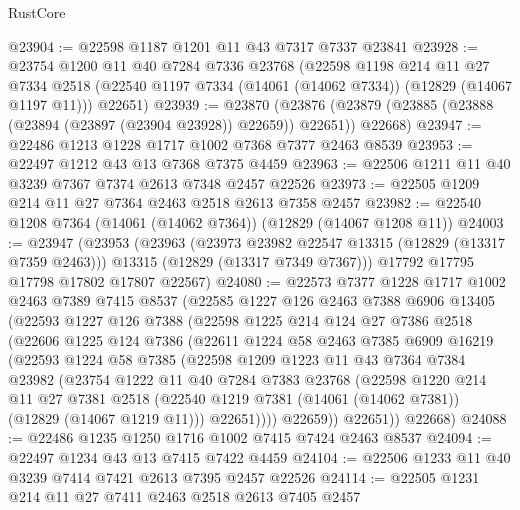 \begin{lexlean}{RustCore}
\begin{coremodule}
@23904 := @22598 @1187 @1201 @11 @43 @7317 @7337 @23841
@23928 := @23754
    @1200
    @11
    @40
    @7284
    @7336
    @23768
    (@22598
      @1198
      @214
      @11
      @27
      @7334
      @2518
      (@22540 @1197 @7334 (@14061 (@14062 @7334)) (@12829 (@14067 @1197 @11)))
      @22651)
@23939 := @23870
    (@23876 (@23879 (@23885 (@23888 (@23894 (@23897 (@23904 @23928)) @22659)) @22651)) @22668)
@23947 := @22486 @1213 @1228 @1717 @1002 @7368 @7377 @2463 @8539
@23953 := @22497 @1212 @43 @13 @7368 @7375 @4459
@23963 := @22506 @1211 @11 @40 @3239 @7367 @7374 @2613 @7348 @2457 @22526
@23973 := @22505 @1209 @214 @11 @27 @7364 @2463 @2518 @2613 @7358 @2457
@23982 := @22540 @1208 @7364 (@14061 (@14062 @7364)) (@12829 (@14067 @1208 @11))
@24003 := @23947
    (@23953
      (@23963
        (@23973 @23982 @22547 @13315 (@12829 (@13317 @7359 @2463)))
        @13315
        (@12829 (@13317 @7349 @7367)))
      @17792
      @17795
      @17798
      @17802
      @17807
      @22567)
@24080 := @22573
    @7377
    @1228
    @1717
    @1002
    @2463
    @7389
    @7415
    @8537
    (@22585
      @1227
      @126
      @2463
      @7388
      @6906
      @13405
      (@22593
        @1227
        @126
        @7388
        (@22598
          @1225
          @214
          @124
          @27
          @7386
          @2518
          (@22606
            @1225
            @124
            @7386
            (@22611
              @1224
              @58
              @2463
              @7385
              @6909
              @16219
              (@22593
                @1224
                @58
                @7385
                (@22598
                  @1209
                  @1223
                  @11
                  @43
                  @7364
                  @7384
                  @23982
                  (@23754
                    @1222
                    @11
                    @40
                    @7284
                    @7383
                    @23768
                    (@22598
                      @1220
                      @214
                      @11
                      @27
                      @7381
                      @2518
                      (@22540 @1219 @7381 (@14061 (@14062 @7381)) (@12829 (@14067 @1219 @11)))
                      @22651))))
              @22659))
          @22651))
      @22668)
@24088 := @22486 @1235 @1250 @1716 @1002 @7415 @7424 @2463 @8537
@24094 := @22497 @1234 @43 @13 @7415 @7422 @4459
@24104 := @22506 @1233 @11 @40 @3239 @7414 @7421 @2613 @7395 @2457 @22526
@24114 := @22505 @1231 @214 @11 @27 @7411 @2463 @2518 @2613 @7405 @2457

\end{coremodule}
\end{lexlean}

